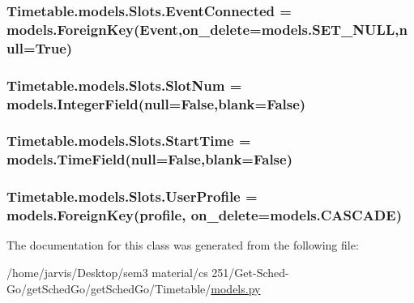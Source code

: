 \subsubsection[{\texorpdfstring{Event\+Connected}{EventConnected}}]{\setlength{\rightskip}{0pt plus 5cm}Timetable.\+models.\+Slots.\+Event\+Connected = models.\+Foreign\+Key({\bf Event},on\+\_\+delete=models.\+S\+E\+T\+\_\+\+N\+U\+LL,null=True)\hspace{0.3cm}{\ttfamily [static]}}\hypertarget{classTimetable_1_1models_1_1Slots_a3fadb94b957239d32884167f6414e140}{}\label{classTimetable_1_1models_1_1Slots_a3fadb94b957239d32884167f6414e140}
\subsubsection[{\texorpdfstring{Slot\+Num}{SlotNum}}]{\setlength{\rightskip}{0pt plus 5cm}Timetable.\+models.\+Slots.\+Slot\+Num = models.\+Integer\+Field(null=False,blank=False)\hspace{0.3cm}{\ttfamily [static]}}\hypertarget{classTimetable_1_1models_1_1Slots_ab3e185c541695f0cc562bb354df36a57}{}\label{classTimetable_1_1models_1_1Slots_ab3e185c541695f0cc562bb354df36a57}
\subsubsection[{\texorpdfstring{Start\+Time}{StartTime}}]{\setlength{\rightskip}{0pt plus 5cm}Timetable.\+models.\+Slots.\+Start\+Time = models.\+Time\+Field(null=False,blank=False)\hspace{0.3cm}{\ttfamily [static]}}\hypertarget{classTimetable_1_1models_1_1Slots_ad9dd5ece43699c860c9613bbc546c908}{}\label{classTimetable_1_1models_1_1Slots_ad9dd5ece43699c860c9613bbc546c908}
\subsubsection[{\texorpdfstring{User\+Profile}{UserProfile}}]{\setlength{\rightskip}{0pt plus 5cm}Timetable.\+models.\+Slots.\+User\+Profile = models.\+Foreign\+Key({\bf profile}, on\+\_\+delete=models.\+C\+A\+S\+C\+A\+DE)\hspace{0.3cm}{\ttfamily [static]}}\hypertarget{classTimetable_1_1models_1_1Slots_af35ce0385f56fb20baaeab2d11e821e3}{}\label{classTimetable_1_1models_1_1Slots_af35ce0385f56fb20baaeab2d11e821e3}


The documentation for this class was generated from the following file\+:\begin{DoxyCompactItemize}
\item 
/home/jarvis/\+Desktop/sem3 material/cs 251/\+Get-\/\+Sched-\/\+Go/get\+Sched\+Go/get\+Sched\+Go/\+Timetable/\hyperlink{Timetable_2models_8py}{models.\+py}\end{DoxyCompactItemize}
